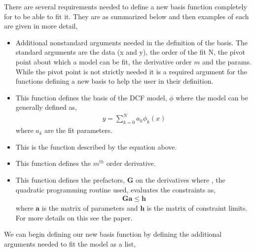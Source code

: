 \documentclass[letterpaper,10pt,english]{sphinxmanual}
\begin{document}
There are several requirements needed to define a new basis function completely
for  to be able to fit it. They are as summarized below and then
examples of each are given in more detail,
\begin{itemize}
\item {} 
 Additional non\sphinxhyphen{}standard  arguments needed in the definition of the
basis. The standard arguments are the data (x and y), the order of the fit N,
the pivot point about which a model can be fit,
the derivative order \({m}\) and the params. While the
pivot point is not strictly needed it is a required argument for the
functions defining a new basis to help the user in their definition.

\item {} 
 This function defines the basis of the DCF model,
\({\phi}\) where the model can be generally defined as,
\begin{equation*}
\begin{split}y = \sum_{k = 0}^N a_k \phi_k(x)\end{split}
\end{equation*}
where \({a_k}\) are the fit parameters.

\item {} 
 This is the function described by the equation above.

\item {} 
 This function defines the \({m^{th}}\) order derivative.

\item {} 
 This function defines the prefactors,
\({\mathbf{G}}\) on the derivatives where , the quadratic
programming routine used, evaluates the constraints as,
\begin{equation*}
\begin{split}\mathbf{Ga} \leq \mathbf{h}\end{split}
\end{equation*}
where \({\mathbf{a}}\) is the matrix of parameters and \({\mathbf{h}}\)
is the matrix of constraint limits. For more details on this see the 
paper.

\end{itemize}

We can begin defining our new basis function by defining the additional arguments
needed to fit the model as a list,
\end{document}
